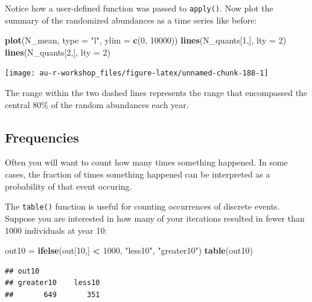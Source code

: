 \documentclass[]{book}
\newenvironment{Shaded}{\begin{snugshade}}{\end{snugshade}}
\newcommand{\DataTypeTok}[1]{\textcolor[rgb]{0.13,0.29,0.53}{#1}}
\newcommand{\DecValTok}[1]{\textcolor[rgb]{0.00,0.00,0.81}{#1}}
\newcommand{\KeywordTok}[1]{\textcolor[rgb]{0.13,0.29,0.53}{\textbf{#1}}}
\newcommand{\NormalTok}[1]{#1}
\newcommand{\OperatorTok}[1]{\textcolor[rgb]{0.81,0.36,0.00}{\textbf{#1}}}
\newcommand{\StringTok}[1]{\textcolor[rgb]{0.31,0.60,0.02}{#1}}
\begin{document}
Notice how a user-defined function was passed to \texttt{apply()}. Now plot the summary of the randomized abundances as a time series like before:

\begin{Shaded}
\begin{Highlighting}[]
\KeywordTok{plot}\NormalTok{(N_mean, }\DataTypeTok{type =} \StringTok{"l"}\NormalTok{, }\DataTypeTok{ylim =} \KeywordTok{c}\NormalTok{(}\DecValTok{0}\NormalTok{, }\DecValTok{10000}\NormalTok{))}
\KeywordTok{lines}\NormalTok{(N_quants[}\DecValTok{1}\NormalTok{,], }\DataTypeTok{lty =} \DecValTok{2}\NormalTok{)}
\KeywordTok{lines}\NormalTok{(N_quants[}\DecValTok{2}\NormalTok{,], }\DataTypeTok{lty =} \DecValTok{2}\NormalTok{)}
\end{Highlighting}
\end{Shaded}

\begin{center}\texttt{[image: au-r-workshop\_files/figure-latex/unnamed-chunk-188-1]} \end{center}

The range within the two dashed lines represents the range that encompassed the central 80\% of the random abundances each year.

\hypertarget{frequencies}{%
\subsection{Frequencies}\label{frequencies}}

Often you will want to count how many times something happened. In some cases, the fraction of times something happened can be interpreted as a probability of that event occuring.

The \texttt{table()} function is useful for counting occurrences of discrete events. Suppose you are interested in how many of your iterations resulted in fewer than 1000 individuals at year 10:

\begin{Shaded}
\begin{Highlighting}[]
\NormalTok{out10 =}\StringTok{ }\KeywordTok{ifelse}\NormalTok{(out[}\DecValTok{10}\NormalTok{,] }\OperatorTok{<}\StringTok{ }\DecValTok{1000}\NormalTok{, }\StringTok{"less10"}\NormalTok{, }\StringTok{"greater10"}\NormalTok{)}
\KeywordTok{table}\NormalTok{(out10)}
\end{Highlighting}
\end{Shaded}

\begin{verbatim}
## out10
## greater10    less10 
##       649       351
\end{verbatim}
\end{document}
